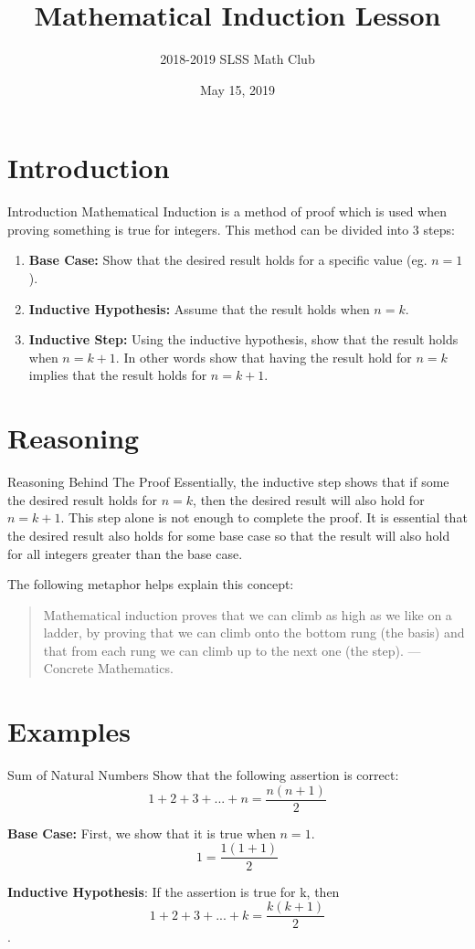 \documentclass{beamer}
\title{Mathematical Induction Lesson}
\author{2018-2019 SLSS Math Club}
\date{May 15, 2019}
\begin{document}
\frame{\titlepage}

\section{Introduction}
\begin{frame}{Introduction}
   Mathematical Induction is a method of proof which is used when proving something is true for integers.
   This method can be divided into 3 steps:
   \begin{enumerate}
       \item \textbf{Base Case:} Show that the desired result holds for a specific value (eg. $n = 1$).
       \item \textbf{Inductive Hypothesis:} Assume that the result holds when $n = k$.
       \item \textbf{Inductive Step:} Using the inductive hypothesis, show that the result holds when $n = k + 1$. In other words show that having the result hold for $n = k$ implies that the result holds for $n = k + 1$.
   \end{enumerate}
\end{frame}

\section{Reasoning}
\begin{frame}{Reasoning Behind The Proof}
    Essentially, the inductive step shows that if some the desired result holds for $n = k$, then the desired result will also hold for $n = k + 1$. This step alone is not enough to complete the proof. It is essential that the desired result also holds for some base case so that the result will also hold for all integers greater than the base case. \newline
    
    The following metaphor helps explain this concept:
    \begin{quote}
        Mathematical induction proves that we can climb as high as we like on a ladder, by proving that we can climb onto the bottom rung (the basis) and that from each rung we can climb up to the next one (the step). \newline
        --- Concrete Mathematics.
    \end{quote}
\end{frame}

\section{Examples}
\begin{frame}{Sum of Natural Numbers}
    Show that the following assertion is correct:
    $$1 + 2 + 3 + ... + n = \frac{n(n+1)}{2}$$
    
    \textbf{Base Case:}
    First, we show that it is true when $n = 1$. 
    $$1 = \frac{1(1+1)}{2}$$
    
    \textbf{Inductive Hypothesis}:
    If the assertion is true for k, then
    $$1 + 2 + 3 + ... + k = \frac{k(k+1)}{2}$$.
\end{frame}
\end{document}
